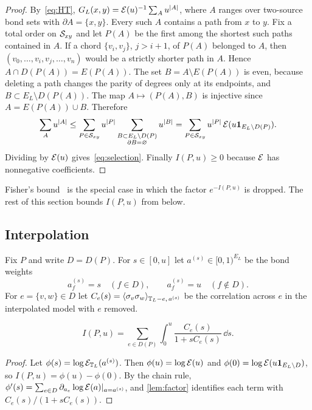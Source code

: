 \begin{proof}
By~\eqref{eq:HT}, $G_L(x,y)=\mathcal E(u)^{-1}\sum_Au^{|A|}$, where $A$ ranges over two-source bond sets with $\partial A=\{x,y\}$. Every such $A$ contains a path from $x$ to $y$. Fix a total order on $\mathcal S_{xy}$ and let $P(A)$ be the first among the shortest such paths contained in $A$. If a chord $\{v_i,v_j\}$, $j>i+1$, of $P(A)$ belonged to $A$, then $(v_0,\dots,v_i,v_j,\dots,v_n)$ would be a strictly shorter path in $A$. Hence $A\cap D(P(A))=E(P(A))$. The set $B=A\setminus E(P(A))$ is even, because deleting a path changes the parity of degrees only at its endpoints, and $B\subset E_L\setminus D(P(A))$. The map $A\mapsto(P(A),B)$ is injective since $A=E(P(A))\cup B$. Therefore
\[
 \sum_Au^{|A|}\le\sum_{P\in\mathcal S_{xy}}u^{|P|}\sum_{\substack{B\subset E_L\setminus D(P)\\ \partial B=\varnothing}}u^{|B|}
 =\sum_{P\in\mathcal S_{xy}}u^{|P|}\,\mathcal E(u\mathbf 1_{E_L\setminus D(P)}).
\]
Dividing by $\mathcal E(u)$ gives~\eqref{eq:selection}. Finally $I(P,u)\ge0$ because $\mathcal E$ has nonnegative coefficients.
\end{proof}

Fisher's bound~\cite{Fis67} is the special case in which the factor $e^{-I(P,u)}$ is dropped. The rest of this section bounds $I(P,u)$ from below.

\subsection{Interpolation}

Fix $P$ and write $D=D(P)$. For $s\in[0,u]$ let $a^{(s)}\in[0,1)^{E_L}$ be the bond weights
\[
 a^{(s)}_f=s\quad(f\in D),\qquad a^{(s)}_f=u\quad(f\notin D).
\]
For $e=\{v,w\}\in D$ let $C_e(s)=\langle \sigma_v\sigma_w\rangle_{\mathbb T_L-e,\,a^{(s)}}$ be the correlation across $e$ in the interpolated model with $e$ removed.

\begin{lemma}\label{lem:interp}
\begin{equation}\label{eq:interp}
 I(P,u)=\sum_{e\in D(P)}\int_0^u\frac{C_e(s)}{1+sC_e(s)}\,\dd s .
\end{equation}
\end{lemma}

\begin{proof}
Let $\phi(s)=\log\mathcal E_{\mathbb T_L}(a^{(s)})$. Then $\phi(u)=\log\mathcal E(u)$ and $\phi(0)=\log\mathcal E(u\mathbf 1_{E_L\setminus D})$, so $I(P,u)=\phi(u)-\phi(0)$. By the chain rule, $\phi'(s)=\sum_{e\in D}\partial_{a_e}\log\mathcal E(a)|_{a=a^{(s)}}$, and \cref{lem:factor} identifies each term with $C_e(s)/(1+sC_e(s))$.
\end{proof}

